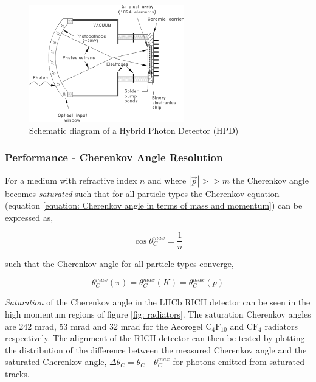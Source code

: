\begin{figure}[htbp]
	\begin{center}
		\includegraphics[width=0.6\textwidth]{./Chapters/detector/rich/hpd_schematic.png}
		\caption{Schematic diagram of a Hybrid Photon Detector (HPD)}
		\label{fig: hpd_schematic}
	\end{center}

\end{figure}

\subsubsection*{Performance - Cherenkov Angle Resolution}
For a medium with refractive index $n$ and where $|\vec{p}| >> m$ the Cherenkov angle becomes \emph{saturated} such that for all particle types the Cherenkov equation (equation \ref{equation: Cherenkov angle in terms of mass and momentum}) can be expressed as,

\begin{equation}
	\cos{\theta_C^{max}} = \frac{1}{n}
	\label{equation: saturated Cherenkov radiation}
\end{equation}

such that the Cherenkov angle for all particle types converge,

\begin{equation}
	\theta_C^{max}(\pi) = \theta_C^{max}(K) = \theta_C^{max}(p)
\end{equation}

\emph{Saturation} of the Cherenkov angle in the LHCb RICH detector can be seen in the high momentum regions of figure \ref{fig: radiators}. The saturation Cherenkov angles are 242 mrad, 53 mrad and 32 mrad for the Aeorogel $\mathrm{C}_4\mathrm{F}_{10}$ and $\mathrm{CF}_4$ radiators respectively. The alignment of the RICH detector can then be tested by plotting the distribution of the difference between the measured Cherenkov angle and the saturated Cherenkov angle, $\Delta\theta_C = \theta_C$ - $\theta_C^{max}$ for photons emitted from saturated tracks.%

